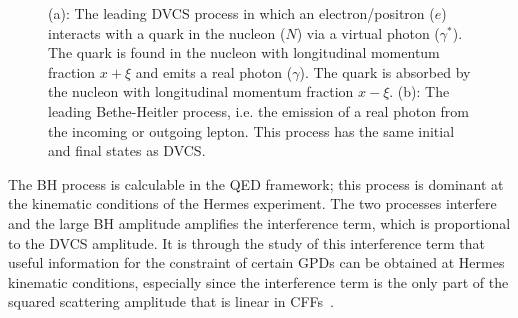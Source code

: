 \documentclass[11pt,a4paper]{article}
\begin{document}
\begin{figure}
\begin{center}
\caption[DVCS and Bethe Heitler hand bag diagram.]{(a): The leading DVCS process in which an electron/positron ($e$) interacts with a quark in the nucleon
($N$) via a virtual photon ($\gamma^\ast$). The quark is found in the
nucleon with longitudinal momentum fraction $x+\xi$ and emits a real
photon ($\gamma$). The quark is absorbed by the nucleon with
longitudinal momentum fraction $x-\xi$. (b): The leading Bethe-Heitler process, i.e. the emission of a real photon from the incoming or outgoing lepton. This process has the same initial and final states as DVCS.}
\label{spin}
\end{center}
\end{figure}
The BH process is calculable in the QED framework; this process is
dominant at the kinematic conditions of the H{\sc ermes} experiment. The
two processes interfere and the large BH amplitude
amplifies the interference term, which is proportional to the DVCS amplitude. It is through the study of this interference term that useful information for the constraint of certain GPDs can be obtained at H{\sc ermes} kinematic conditions, especially since the interference term is the only part of the squared scattering amplitude that is linear in CFFs~\cite{Bel02b}.
\end{document}
